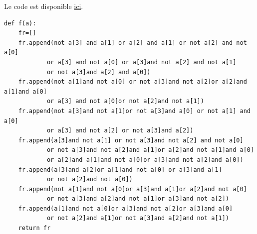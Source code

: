 Le code est disponible \href{https://github.com/Costadoat/S10/raw/master/TP01\%20Fonctions\%20combinatoires/Code/Calculatrice.py}{ici}.

\begin{verbatim}
def f(a):
    fr=[]
    fr.append(not a[3] and a[1] or a[2] and a[1] or not a[2] and not a[0]
    		or a[3] and not a[0] or a[3]and not a[2] and not a[1]
    		or not a[3]and a[2] and a[0])
    fr.append(not a[1]and not a[0] or not a[3]and not a[2]or a[2]and a[1]and a[0]
    		or a[3] and not a[0]or not a[2]and not a[1])
    fr.append(not a[3]and not a[1]or not a[3]and a[0] or not a[1] and a[0]
    		or a[3] and not a[2] or not a[3]and a[2])
    fr.append(a[3]and not a[1] or not a[3]and not a[2] and not a[0]
    		or not a[3]and not a[2]and a[1]or a[2]and not a[1]and a[0]
    		or a[2]and a[1]and not a[0]or a[3]and not a[2]and a[0])
    fr.append(a[3]and a[2]or a[1]and not a[0] or a[3]and a[1]
    		or not a[2]and not a[0])
    fr.append(not a[1]and not a[0]or a[3]and a[1]or a[2]and not a[0]
    		or not a[3]and a[2]and not a[1]or a[3]and not a[2])
    fr.append(a[1]and not a[0]or a[3]and not a[2]or a[3]and a[0]
    		or not a[2]and a[1]or not a[3]and a[2]and not a[1])
    return fr
\end{verbatim}
    

